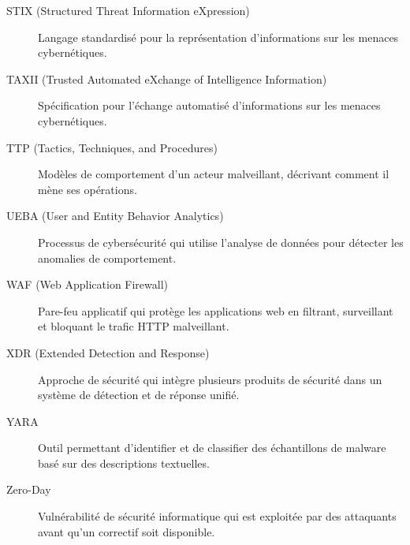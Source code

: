 \begin{description}
    \item[STIX (Structured Threat Information eXpression)]
          Langage standardisé pour la représentation d'informations sur les menaces cybernétiques.

    \item[TAXII (Trusted Automated eXchange of Intelligence Information)]
          Spécification pour l'échange automatisé d'informations sur les menaces cybernétiques.

    \item[TTP (Tactics, Techniques, and Procedures)]
          Modèles de comportement d'un acteur malveillant, décrivant comment il mène ses opérations.

    \item[UEBA (User and Entity Behavior Analytics)]
          Processus de cybersécurité qui utilise l'analyse de données pour détecter les anomalies de comportement.

    \item[WAF (Web Application Firewall)]
          Pare-feu applicatif qui protège les applications web en filtrant, surveillant et bloquant le trafic HTTP malveillant.

    \item[XDR (Extended Detection and Response)]
          Approche de sécurité qui intègre plusieurs produits de sécurité dans un système de détection et de réponse unifié.

    \item[YARA]
          Outil permettant d'identifier et de classifier des échantillons de malware basé sur des descriptions textuelles.

    \item[Zero-Day]
          Vulnérabilité de sécurité informatique qui est exploitée par des attaquants avant qu'un correctif soit disponible.

\end{description}
